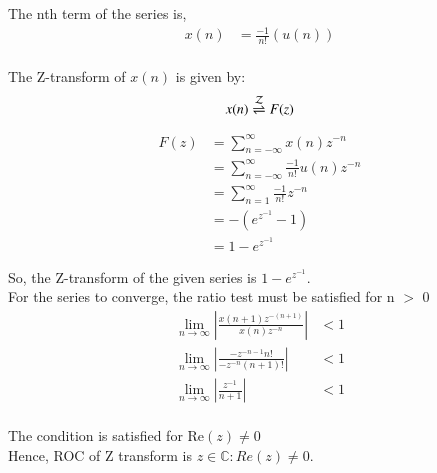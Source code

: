 \documentclass[journal,12pt,twocolumn]{IEEEtran}
\begin{document}
The nth term of the series is, 
\begin{align*}
    x(n) & = \frac{-1}{n!} (u(n))
\end{align*}  \\

The Z-transform of $ x(n) $ is given by:
$$x(n) \overset{\mathcal{Z}}{ \rightleftharpoons} F(z)$$

\begin{align*}
    F(z) & = \sum_{n=-\infty}^{\infty} x(n)   z^{-n} \\
    & = \sum_{n=-\infty}^{\infty} \frac{-1}{n!}  u(n)   z^{-n} \\
    & = \sum_{n=1}^{\infty} \frac{-1}{n!}   z^{-n} \\
    & = - (e^{z^{-1}} - 1) \\       
    & = 1 - e^{z^{-1}}  
\end{align*}

So, the Z-transform of the given series is 
$ 1 - e^{z^{-1}} $.\\


For the series to converge, the ratio test must be satisfied for n $>$ 0
\begin{align*}
 \lim_{{n \to \infty}} \left| \frac{x(n+1) z^{-(n+1)}}{x(n) z^{-n}} \right| & <  1 \\
\lim_{{n \to \infty}} \left| \frac{-z^{-n-1} n!}{-z^{-n} (n+1)!}\right| & < 1\\
\lim_{{n \to \infty}} \left| \frac{z^{-1}}{n+1} \right| & < 1\\
\end{align*}

The condition is satisfied for $ \text{Re}(z) \neq 0 $ \\

Hence, ROC of Z transform is $z \in \mathbb{C} : Re(z) \neq 0$.
\end{document}

